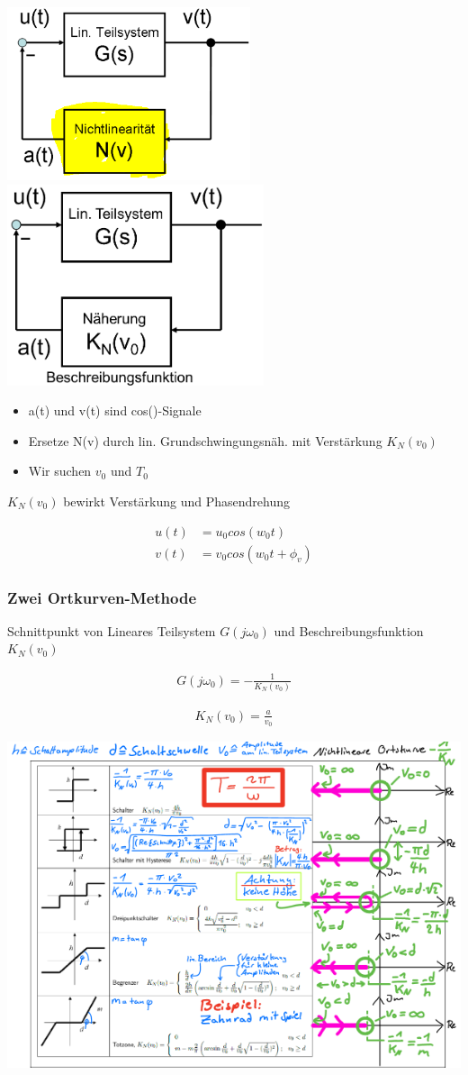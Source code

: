 \documentclass[10pt,a4paper]{article}
\begin{document}
  \begin{center}
      \includegraphics[width=.22\textwidth]{./img/harm1.png}
      \includegraphics[width=.2\textwidth]{./img/harm2.png}
  \end{center}
  \begin{itemize}
      \item a(t) und v(t) sind cos()-Signale
      \item Ersetze N(v) durch lin. Grundschwingungsnäh. mit Verstärkung $K_N(v_0)$
      \item Wir suchen $v_0$ und $T_0$
  \end{itemize}
  $K_N(v_0)$ bewirkt Verstärkung und Phasendrehung 
  \begin{mdframed}[style=exercise]
    \begin{align}
        u(t) &= u_0 cos (w_0 t) \\
        v(t) &= v_0 cos (w_0 t + \phi_v)
    \end{align}
  \end{mdframed}

  \subsubsection{Zwei Ortkurven-Methode}
  Schnittpunkt von Lineares Teilsystem $G(j\omega_0)$ und Beschreibungsfunktion $K_N(v_0)$
  \begin{mdframed}[style=exercise]
    \begin{align}
        G(j\omega_0) = -\frac{1}{K_N(v_0)}
    \end{align}
  \end{mdframed}

  \begin{mdframed}[style=exercise]
    \begin{align}
        K_N(v_0) = \frac{a}{v_0}
    \end{align}
  \end{mdframed}

  \clearpage
  \begin{center}
      \includegraphics[width=.8\textwidth]{./img/K_N.png}
  \end{center}
\end{document}
